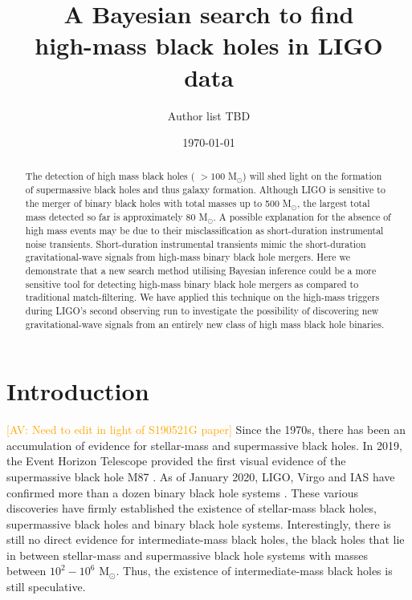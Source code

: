 \documentclass[%
preprint,
 amsmath,amssymb,
 aps,
]{revtex4}
\newcommand{\msun}{{\sc M${}_\odot$}\xspace}
\newcommand{\av}[1]{\textcolor{orange}{[AV: #1]}}
\begin{document}

\title{A Bayesian search to find \\high-mass black holes in LIGO data}%



\author{Author list TBD}

\date{\today}

\begin{abstract}

The detection of high mass black holes ( $>100$ \msun) will shed light on the formation of supermassive black holes and thus galaxy formation. Although LIGO is sensitive to the merger of binary black holes with total masses up to 500 \msun, the largest total mass detected so far is approximately $80$ \msun. A possible explanation for the absence of high mass events may be due to their misclassification as short-duration instrumental noise transients. Short-duration instrumental transients mimic the short-duration gravitational-wave signals from high-mass binary black hole mergers. Here we demonstrate that a new search method utilising Bayesian inference could be a more sensitive tool for detecting high-mass binary black hole mergers as compared to traditional match-filtering. We have applied this technique on the high-mass triggers during LIGO's second observing run to investigate the possibility of discovering new gravitational-wave signals from an entirely new class of high mass black hole binaries.



\end{abstract}

\maketitle



\section{\label{sec:Introduction}Introduction}
\av{Need to edit in light of S190521G paper}
Since the 1970s, there has been an accumulation of evidence for stellar-mass and supermassive black holes. In 2019, the Event Horizon Telescope provided the first visual evidence of the supermassive black hole M87  \cite{m87photo}.  As of January 2020, LIGO, Virgo and IAS have confirmed more than a dozen binary black hole systems \cite{GWTC1, IAS0, IAS1, IAS2, pycbc_ogc_2}. These various discoveries have firmly established the existence of stellar-mass black holes, supermassive black holes and binary black hole systems.  Interestingly, there is still no direct evidence for intermediate-mass black holes, the black holes that lie in between stellar-mass and supermassive black hole systems with masses between $10^2-10^6$ \msun. Thus, the existence of intermediate-mass black holes is still speculative. \\
\end{document}
